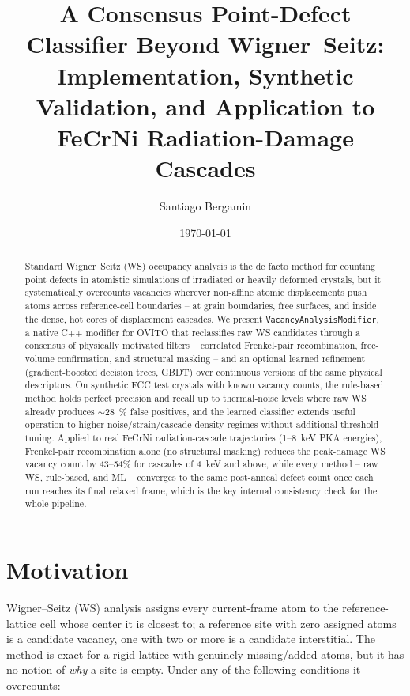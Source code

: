 \documentclass[11pt]{article}
\title{A Consensus Point-Defect Classifier Beyond Wigner--Seitz:\\
\large Implementation, Synthetic Validation, and Application to FeCrNi Radiation-Damage Cascades}
\author{Santiago Bergamin}
\date{\today}
\newcommand{\code}[1]{\texttt{#1}}
\begin{document}
\maketitle

\begin{abstract}
Standard Wigner--Seitz (WS) occupancy analysis is the de facto method for counting point defects in
atomistic simulations of irradiated or heavily deformed crystals, but it systematically overcounts
vacancies wherever non-affine atomic displacements push atoms across reference-cell boundaries --
at grain boundaries, free surfaces, and inside the dense, hot cores of displacement cascades. We
present \code{VacancyAnalysisModifier}, a native C++ modifier for OVITO that reclassifies raw WS
candidates through a consensus of physically motivated filters -- correlated Frenkel-pair
recombination, free-volume confirmation, and structural masking -- and an optional learned
refinement (gradient-boosted decision trees, GBDT) over continuous versions of the same physical
descriptors. On synthetic FCC test crystals with known vacancy counts, the rule-based method holds
perfect precision and recall up to thermal-noise levels where raw WS already produces
$\sim$\SI{28}{\percent} false positives, and the learned classifier extends useful operation to
higher noise/strain/cascade-density regimes without additional threshold tuning. Applied to real
FeCrNi radiation-cascade trajectories (1--8~keV PKA energies), Frenkel-pair recombination alone
(no structural masking) reduces the peak-damage WS vacancy count by 43--54\% for cascades of
4~keV and above, while every method -- raw WS, rule-based, and ML -- converges to the same
post-anneal defect count once each run reaches its final relaxed frame, which is the key internal
consistency check for the whole pipeline.
\end{abstract}

\tableofcontents

\section{Motivation}

Wigner--Seitz (WS) analysis assigns every current-frame atom to the reference-lattice cell whose
center it is closest to; a reference site with zero assigned atoms is a candidate vacancy, one with
two or more is a candidate interstitial. The method is exact for a rigid lattice with genuinely
missing/added atoms, but it has no notion of \emph{why} a site is empty. Under any of the following
conditions it overcounts:
\end{document}
